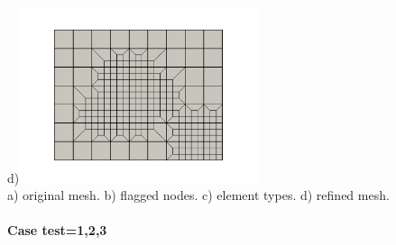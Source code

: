 \begin{center}
d)\includegraphics[width=7cm]{python_codes/fieldstone_102/results/test0/mesh4}\\
{\captionfont a) original mesh. b) flagged nodes. c) element types. d) refined mesh.}
\end{center}

\paragraph{Case test=1,2,3}


